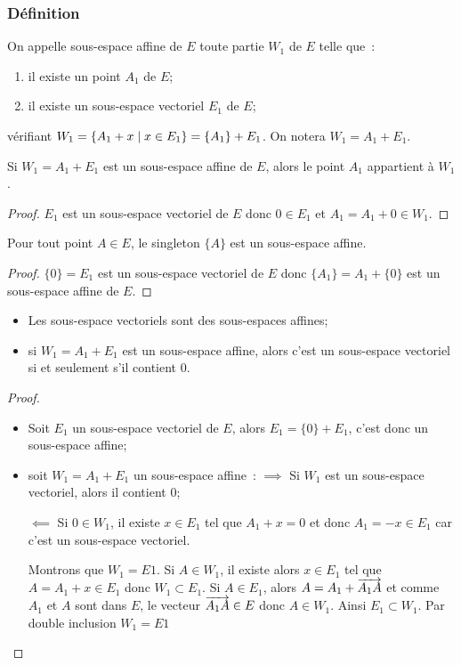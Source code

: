 \subsubsection{Définition}

\begin{defdef}
  On appelle sous-espace affine de \(E\) toute partie \(W_1\) de \(E\) telle que~:
  \begin{enumerate}
    \item il existe un point \(A_1\) de \(E\);
    \item il existe un sous-espace vectoriel \(E_1\) de \(E\);
  \end{enumerate}
  vérifiant \(W_1=\left\{A_1+x\mathrel{}\middle|\mathrel{}x \in E_1\right\} = \{A_1\}+E_1\). On notera \(W_1=A_1+E_1\).
\end{defdef}
%
\begin{prop}
  Si \(W_1=A_1+E_1\) est un sous-espace affine de \(E\), alors le point \(A_1\) appartient à \(W_1\).
\end{prop}
\begin{proof}
  \(E_1\) est un sous-espace vectoriel de \(E\) donc \(0 \in E_1\) et \(A_1=A_1 +0 \in W_1\).
\end{proof}
%
\begin{prop}
  Pour tout point \(A \in E\), le singleton \(\{A\}\) est un sous-espace affine.
\end{prop}
\begin{proof}
  \(\{0\}=E_1\) est un sous-espace vectoriel de \(E\) donc \(\{A_1\} = A_1 +\{0\}\) est un sous-espace affine de \(E\).
\end{proof}
%
\begin{prop}
  \begin{itemize}
    \item Les sous-espace vectoriels sont des sous-espaces affines;
    \item si \(W_1=A_1+E_1\) est un sous-espace affine, alors c'est un sous-espace vectoriel si et seulement s'il contient \(0\).
  \end{itemize}
\end{prop}
\begin{proof}
  \begin{itemize}
    \item Soit \(E_1\) un sous-espace vectoriel de \(E\), alors \(E_1=\{0\}+E_1\), c'est donc un sous-espace affine;
    \item soit \(W_1=A_1+E_1\) un sous-espace affine~: \(\implies\) Si \(W_1\) est un sous-espace vectoriel, alors il contient \(0\);

      \(\impliedby\) Si \(0 \in W_1\), il existe \(x \in E_1\) tel que \(A_1+x=0\) et donc \(A_1 = -x \in E_1\) car c'est un sous-espace vectoriel.

      Montrons que \(W_1=E1\). Si \(A \in W_1\), il existe alors \(x \in E_1\) tel que \(A=A_1+x \in E_1\) donc \(W_1 \subset E_1\). Si \(A \in E_1\), alors \(A=A_1 +\overrightarrow{A_1A}\) et comme \(A_1\) et \(A\) sont dans \(E\), le vecteur \(\overrightarrow{A_1A} \in E\) donc \(A \in W_1\). Ainsi \(E_1 \subset W_1\). Par double inclusion \(W_1=E1\)
  \end{itemize}
\end{proof}

